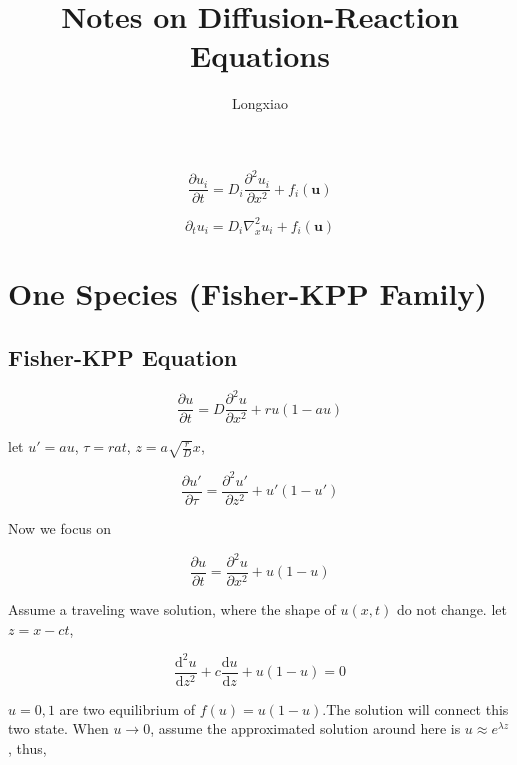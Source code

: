 \documentclass[
]{article}
\title{Notes on Diffusion-Reaction Equations}
\author{Longxiao}
\date{}
\begin{document}
\maketitle

    \begin{equation*}
        \frac{\partial u_i}{\partial t} = D_{i} \frac{\partial ^2 u_{i}}{\partial x^2} + f_i(\mathbf{u})
    \end{equation*}

    \begin{equation*}
        \partial_t u_{i} = D_{i} \nabla_{x}^{2}u_{i} + f_{i}(\mathbf{u})
    \end{equation*}

\section{One Species (Fisher-KPP
Family)}\label{one-species-fisher-kpp-family}

    \subsection{Fisher-KPP Equation}\label{fisher-kpp-equation}

    \begin{equation*}
        \frac{\partial u}{\partial t} = D \frac{\partial ^2 u} {\partial x^2} + r u (1-au)
    \end{equation*}

    let $u' = au$, $\tau=r a t$, $z = a \sqrt{\frac{r}{D}}x$,

    \begin{equation*}
        \frac{\partial u'}{\partial \tau} = \frac{\partial ^2 u'} {\partial z^2} +  u' (1-u')
    \end{equation*}

Now we focus on

\begin{equation*}
\frac{\partial u}{\partial t} = \frac{\partial ^2 u} {\partial x^2} +  u (1-u)
\end{equation*}

Assume a traveling wave solution, where the shape of $u(x,t)$ do not
change. let $z = x-ct$,

\begin{equation*}
\frac{\mathrm{d}^2 u}{\mathrm{d} z^2} + c \frac{\mathrm{d} u}{\mathrm{d} z} + u(1-u) = 0
\end{equation*}

$u = 0,1$ are two equilibrium of $f(u) = u (1-u)$.The solution will
connect this two state. When $u \rightarrow 0$, assume the
approximated solution around here is $u \approx e^{\lambda z}$, thus,
\end{document}
